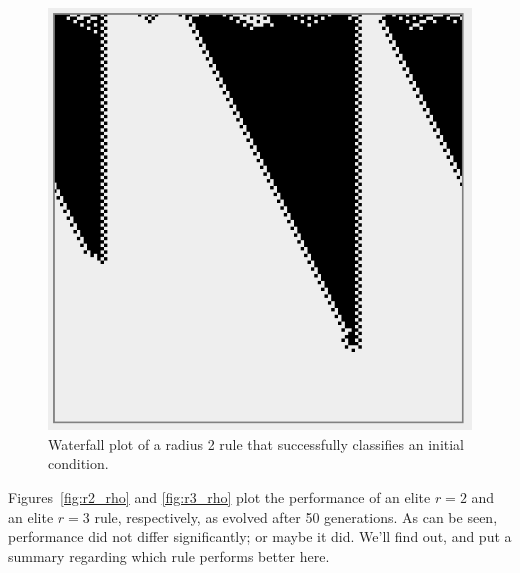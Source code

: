 \begin{figure}
\begin{center}
\includegraphics[width=0.8\linewidth]{figures/converging_radius2.png}
\caption{Waterfall plot of a radius 2 rule that successfully classifies an initial condition.}
\label{fig:waterfall_2}
\end{center}
\end{figure}

Figures~\ref{fig:r2_rho} and \ref{fig:r3_rho} plot the performance of an elite $r = 2$ and an elite $r = 3$ rule, respectively, as evolved after 50 generations. As can be seen, performance did not differ significantly; or maybe it did. We'll find out, and put a summary regarding which rule performs better here.

